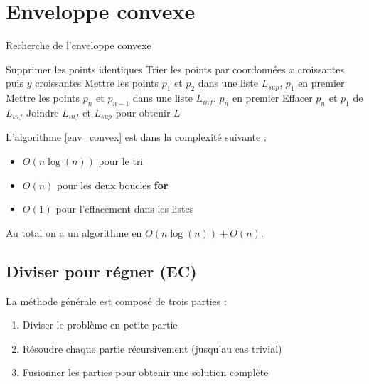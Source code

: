 \documentclass[11pt,a4paper]{report}
\begin{document}
\section{Enveloppe convexe}

\begin{algorithm}[H]
\caption{Recherche de l'enveloppe convexe}
\label{env_convex}
Supprimer les points identiques\;
Trier les points par coordonnées $x$ croissantes puis $y$ croissantes\;
Mettre les points $p_1$ et $p_2$ dans une liste $L_{sup}$, $p_1$ en premier\;
Mettre les points $p_n$ et $p_{n-1}$ dans une liste $L_{inf}$, $p_n$ en premier\;
Effacer $p_n$ et $p_1$ de $L_{inf}$\;
Joindre $L_{inf}$ et $L_{sup}$ pour obtenir $L$\;
\end{algorithm}

L'algorithme \ref{env_convex} est dans la complexité suivante :
\begin{itemize}
    \item $O(n \log(n))$ pour le tri
    \item $O(n)$ pour les deux boucles \textbf{for}
    \item $O(1)$ pour l'effacement dans les listes
\end{itemize}

Au total on a un algorithme en $O(n \log(n)) + O(n)$.

\subsection{Diviser pour régner (\textbf{EC})}

La méthode générale est composé de trois parties :
\begin{enumerate}
    \item Diviser le problème en petite partie
    \item Résoudre chaque partie récursivement (jusqu'au cas trivial)
    \item Fusionner les parties pour obtenir une solution complète
\end{enumerate}
\end{document}

